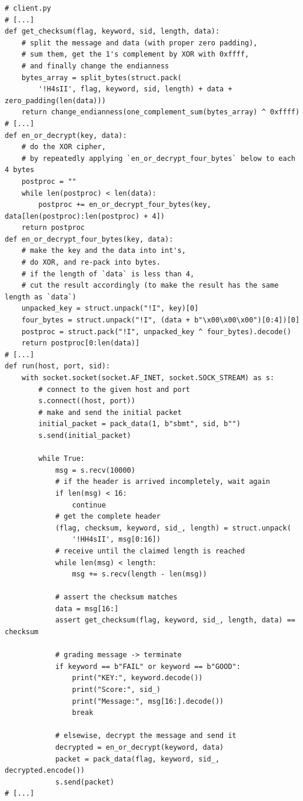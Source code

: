\documentclass{homework}
\begin{document}
\begin{verbatim}
# client.py
# [...]
def get_checksum(flag, keyword, sid, length, data):
    # split the message and data (with proper zero padding),
    # sum them, get the 1's complement by XOR with 0xffff,
    # and finally change the endianness
    bytes_array = split_bytes(struct.pack(
        '!H4sII', flag, keyword, sid, length) + data + zero_padding(len(data)))
    return change_endianness(one_complement_sum(bytes_array) ^ 0xffff)
# [...]
def en_or_decrypt(key, data):
    # do the XOR cipher,
    # by repeatedly applying `en_or_decrypt_four_bytes` below to each 4 bytes
    postproc = ""
    while len(postproc) < len(data):
        postproc += en_or_decrypt_four_bytes(key, data[len(postproc):len(postproc) + 4])
    return postproc
def en_or_decrypt_four_bytes(key, data):
    # make the key and the data into int's,
    # do XOR, and re-pack into bytes.
    # if the length of `data` is less than 4,
    # cut the result accordingly (to make the result has the same length as `data`)
    unpacked_key = struct.unpack("!I", key)[0]
    four_bytes = struct.unpack("!I", (data + b"\x00\x00\x00")[0:4])[0]
    postproc = struct.pack("!I", unpacked_key ^ four_bytes).decode()
    return postproc[0:len(data)]
# [...]
def run(host, port, sid):
    with socket.socket(socket.AF_INET, socket.SOCK_STREAM) as s:
        # connect to the given host and port
        s.connect((host, port))
        # make and send the initial packet
        initial_packet = pack_data(1, b"sbmt", sid, b"")
        s.send(initial_packet)

        while True:
            msg = s.recv(10000)
            # if the header is arrived incompletely, wait again
            if len(msg) < 16:
                continue
            # get the complete header
            (flag, checksum, keyword, sid_, length) = struct.unpack(
                '!HH4sII', msg[0:16])
            # receive until the claimed length is reached
            while len(msg) < length:
                msg += s.recv(length - len(msg))

            # assert the checksum matches
            data = msg[16:]
            assert get_checksum(flag, keyword, sid_, length, data) == checksum

            # grading message -> terminate
            if keyword == b"FAIL" or keyword == b"GOOD":
                print("KEY:", keyword.decode())
                print("Score:", sid_)
                print("Message:", msg[16:].decode())
                break

            # elsewise, decrypt the message and send it
            decrypted = en_or_decrypt(keyword, data)
            packet = pack_data(flag, keyword, sid_, decrypted.encode())
            s.send(packet)
# [...]
\end{verbatim}
\end{document}
